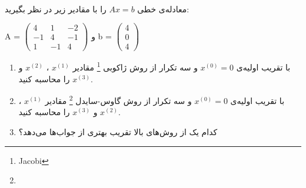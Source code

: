 \\
معادله‌ی خطی
$Ax = b$
را با مقادیر زیر در نظر بگیرید:
\begin{LTR}
\begin{center}
A = $\begin{pmatrix}
4 & 1 & -2\\
-1 & 4 & -1\\
1 & -1 & 4
\end{pmatrix}$ و
b =  $\begin{pmatrix}
4\\
0\\
4
\end{pmatrix}$
\end{center}
\end{LTR}

\begin{enumerate}
\item
با تقریب اولیه‌ی
$x^{(0)} = 0$
و سه تکرار از روش ژاکوبی
\footnote{Jacobi}
مقادیر
$x^{(1)}$
،
$x^{(2)}$
و
$x^{(3)}$
را محاسبه کنید.

\item
با تقریب اولیه‌ی
$x^{(0)} = 0$
و سه تکرار از روش گاوس-سایدل
\footnote{}
مقادیر
$x^{(1)}$
،
$x^{(2)}$
و
$x^{(3)}$
را محاسبه کنید.
\item
کدام یک از روش‌های بالا تقریب بهتری از جواب‌ها می‌دهد؟

\end{enumerate}

